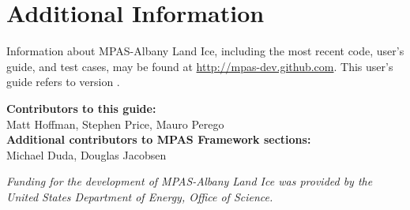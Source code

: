\section{Additional Information}
Information about MPAS-Albany Land Ice, including the most recent code, user's guide, and test cases, may be found at \url{http://mpas-dev.github.com}.  This user's guide refers to version \version.

\vspace{8pt}
\noindent
{\bf Contributors to this guide:}\\
Matt Hoffman, Stephen Price, Mauro Perego\\
{\bf Additional contributors to MPAS Framework sections:}\\
Michael Duda, Douglas Jacobsen

\vspace{8pt}
\noindent
{\it Funding for the development of MPAS-Albany Land Ice was provided by the United States Department of Energy, Office of Science.}




